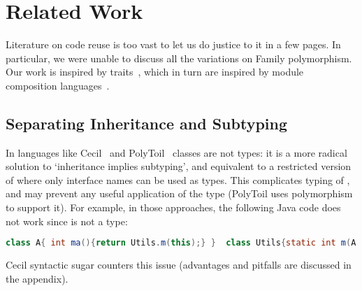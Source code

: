 \saveSpace
\section{Related Work}
\saveSpace
Literature on code reuse is too vast to let us do justice to it in a few pages.
In particular, we were unable to discuss all the variations on Family polymorphism.
Our work is inspired by traits~\cite{ducasse2006traits}, which in turn
are inspired by module composition languages~\cite{ancona2002calculus}.

\subsection{Separating Inheritance and Subtyping}
In languages like Cecil~\cite{chambers1995typechecking} and PolyToil~\cite{bruce1995polytoil}
classes are not types: it is a more radical solution to `inheritance implies subtyping', and equivalent to a restricted version of \name where only interface names can be used as types.
This complicates typing of \Q@this@,
and may prevent any useful application of the \Q@This@ type (PolyToil uses polymorphism to support it).
For example, in those approaches, the following Java code does not work since \Q@A@ is not a type:
\saveSpace\saveSpace\begin{lstlisting}[language=Java]
class A{ int ma(){return Utils.m(this);} }  class Utils{static int m(A a){..}}
\end{lstlisting}\saveSpace\saveSpace
Cecil syntactic sugar counters this issue (advantages and pitfalls are discussed in the appendix).


